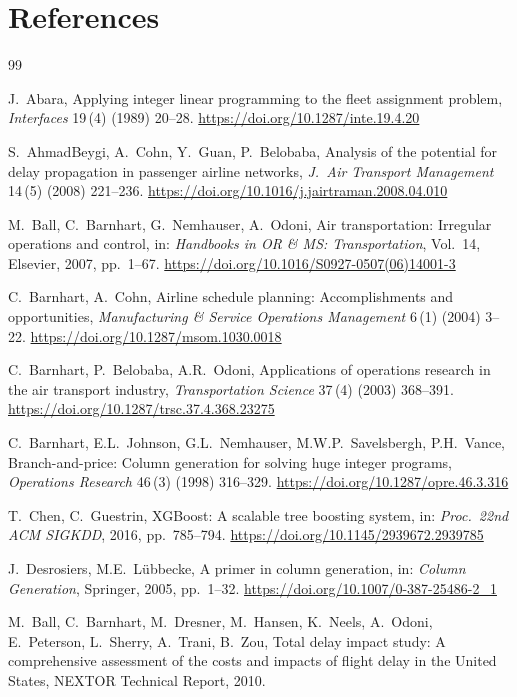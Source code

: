 \documentclass[12pt,number]{elsarticle}
\begin{document}
\section*{References}

\FloatBarrier

\begin{thebibliography}{99}

 J.~Abara, Applying integer linear programming to the fleet assignment problem, \textit{Interfaces} 19\,(4) (1989) 20--28. \url{https://doi.org/10.1287/inte.19.4.20}

 S.~AhmadBeygi, A.~Cohn, Y.~Guan, P.~Belobaba, Analysis of the potential for delay propagation in passenger airline networks, \textit{J.\ Air Transport Management} 14\,(5) (2008) 221--236. \url{https://doi.org/10.1016/j.jairtraman.2008.04.010}

 M.~Ball, C.~Barnhart, G.~Nemhauser, A.~Odoni, Air transportation: Irregular operations and control, in: \textit{Handbooks in OR \& MS: Transportation}, Vol.~14, Elsevier, 2007, pp.~1--67. \url{https://doi.org/10.1016/S0927-0507(06)14001-3}

 C.~Barnhart, A.~Cohn, Airline schedule planning: Accomplishments and opportunities, \textit{Manufacturing \& Service Operations Management} 6\,(1) (2004) 3--22. \url{https://doi.org/10.1287/msom.1030.0018}

 C.~Barnhart, P.~Belobaba, A.R.~Odoni, Applications of operations research in the air transport industry, \textit{Transportation Science} 37\,(4) (2003) 368--391. \url{https://doi.org/10.1287/trsc.37.4.368.23275}

 C.~Barnhart, E.L.~Johnson, G.L.~Nemhauser, M.W.P.~Savelsbergh, P.H.~Vance, Branch-and-price: Column generation for solving huge integer programs, \textit{Operations Research} 46\,(3) (1998) 316--329. \url{https://doi.org/10.1287/opre.46.3.316}

 T.~Chen, C.~Guestrin, XGBoost: A scalable tree boosting system, in: \textit{Proc.\ 22nd ACM SIGKDD}, 2016, pp.~785--794. \url{https://doi.org/10.1145/2939672.2939785}

 J.~Desrosiers, M.E.~L\"ubbecke, A primer in column generation, in: \textit{Column Generation}, Springer, 2005, pp.~1--32. \url{https://doi.org/10.1007/0-387-25486-2_1}

 M.~Ball, C.~Barnhart, M.~Dresner, M.~Hansen, K.~Neels, A.~Odoni, E.~Peterson, L.~Sherry, A.~Trani, B.~Zou, Total delay impact study: A comprehensive assessment of the costs and impacts of flight delay in the United States, NEXTOR Technical Report, 2010.


\end{thebibliography}
\end{document}
